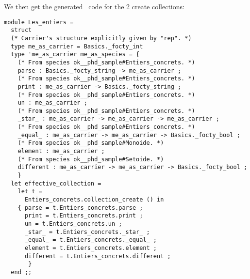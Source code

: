 We then get the generated \ocaml\ code for the 2 create collections:
{\footnotesize
\begin{lstlisting}[language=MyOCaml]
module Les_entiers =
  struct
  (* Carrier's structure explicitly given by "rep". *)
  type me_as_carrier = Basics._focty_int
  type 'me_as_carrier me_as_species = {
    (* From species ok__phd_sample#Entiers_concrets. *)
    parse : Basics._focty_string -> me_as_carrier ;
    (* From species ok__phd_sample#Entiers_concrets. *)
    print : me_as_carrier -> Basics._focty_string ;
    (* From species ok__phd_sample#Entiers_concrets. *)
    un : me_as_carrier ;
    (* From species ok__phd_sample#Entiers_concrets. *)
    _star_ : me_as_carrier -> me_as_carrier -> me_as_carrier ;
    (* From species ok__phd_sample#Entiers_concrets. *)
    _equal_ : me_as_carrier -> me_as_carrier -> Basics._focty_bool ;
    (* From species ok__phd_sample#Monoide. *)
    element : me_as_carrier ;
    (* From species ok__phd_sample#Setoide. *)
    different : me_as_carrier -> me_as_carrier -> Basics._focty_bool ;
    }
  let effective_collection =
    let t =
      Entiers_concrets.collection_create () in
    { parse = t.Entiers_concrets.parse ;
      print = t.Entiers_concrets.print ;
      un = t.Entiers_concrets.un ;
      _star_ = t.Entiers_concrets._star_ ;
      _equal_ = t.Entiers_concrets._equal_ ;
      element = t.Entiers_concrets.element ;
      different = t.Entiers_concrets.different ;
       }
  end ;;


\end{lstlisting}}
